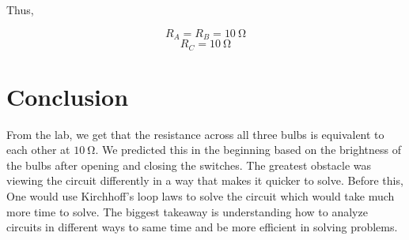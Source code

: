\documentclass[12pt]{article}
\begin{document}
Thus,

\[R_A = R_B = \SI{10}{\ohm}\]
\[R_C = \SI{10}{\ohm}\]

\section{Conclusion}
From the lab, we get that the resistance across all three bulbs is equivalent to each other at $\SI{10}{\ohm}$. We predicted this in the beginning based on the brightness of the bulbs after opening and closing the switches. The greatest obstacle was viewing the circuit differently in a way that makes it quicker to solve. Before this, One would use Kirchhoff's loop laws to solve the circuit which would take much more time to solve. The biggest takeaway is understanding how to analyze circuits in different ways to same time and be more efficient in solving problems.
\end{document}
